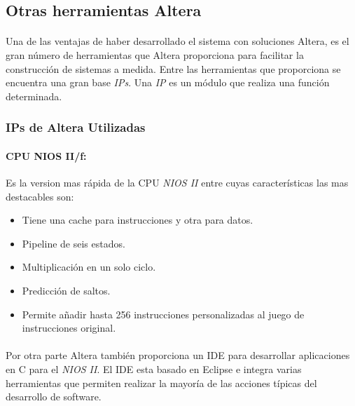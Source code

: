 \documentclass[a4paper,12pt,titlepage,final]{book}
\begin{document}
\subsection{Otras herramientas Altera }

\paragraph{}
Una de las ventajas de haber desarrollado el sistema con soluciones Altera, es el gran número de herramientas que Altera proporciona para facilitar la construcción de sistemas a medida. Entre las herramientas que proporciona se encuentra una gran base \textit{IPs}. Una \textit{IP} es un módulo que realiza una función determinada.

\subsubsection{IPs de Altera Utilizadas}

\paragraph{CPU NIOS II/f:}
Es la version mas rápida de la CPU \textit{NIOS II} entre cuyas características las mas destacables son:

\begin{itemize}
\item Tiene una cache para instrucciones y otra para datos.

\item Pipeline de seis estados.

\item Multiplicación en un solo ciclo.

\item Predicción de saltos.

\item Permite añadir hasta 256 instrucciones personalizadas al juego de instrucciones original.

\end{itemize}

\paragraph{}
Por otra parte Altera también proporciona un IDE para desarrollar aplicaciones en C para el \textit{NIOS II}. El IDE esta basado en Eclipse e integra varias herramientas que permiten realizar la mayoría de las acciones típicas del desarrollo de software.
\end{document}
